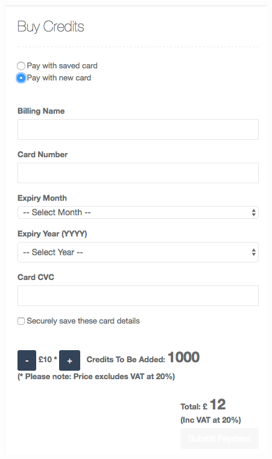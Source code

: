 \begin{minipage}{.49\textwidth}
  \includegraphics[width=\textwidth]{screenshot-payment-form.png}
 	\label{fig:paymentform-screenshot}
\end{minipage}

